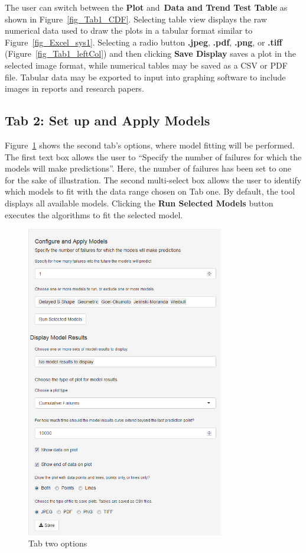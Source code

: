 \documentclass[conference]{IEEEtran}
\begin{document}
The user can switch between the \textbf{Plot} and~\textbf{Data and Trend Test Table} as shown in Figure~\ref{fig_Tab1_CDF}. Selecting table view displays the raw numerical data used to draw the plots in a tabular format similar to Figure~\ref{fig_Excel_sys1}. Selecting a radio button \textbf{.jpeg}, \textbf{.pdf}, \textbf{.png}, or \textbf{.tiff} (Figure~\ref{fig_Tab1_leftCol}) and then clicking \textbf{Save Display} saves a plot in the selected image format, while numerical tables may be saved as a CSV or PDF file. Tabular data may be exported to input into graphing software to include images in reports and research papers.


\subsection{Tab 2: Set up and Apply Models}\label{tab2}
Figure~\ref{fig_Tab2} shows the second tab's options, where model fitting will be performed. The first text box allows the user to ``Specify the number of failures for which the models will make predictions''. Here, the number of failures has been set to one for the sake of illustration. The second multi-select box allows the user to identify which models to fit with the data range chosen on Tab one. By default, the tool displays all available models. Clicking the \textbf{Run Selected Models} button executes the algorithms to fit the selected model.

\begin{figure}[!h]
\centering%
\includegraphics[width=3.4in]{Figures/Fig8}
\caption{Tab two options}
\label{fig_Tab2}
\end{figure}
\end{document}
